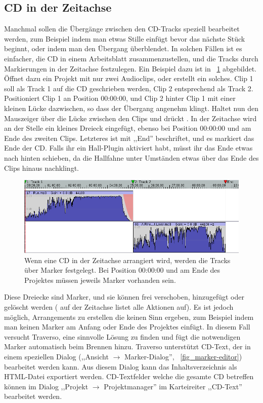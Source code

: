 \subsection{CD in der Zeitachse}
Manchmal sollen die Übergänge zwischen den CD-Tracks speziell bearbeitet werden, zum Beispiel indem man etwas Stille einfügt bevor das nächste Stück beginnt, oder indem man den Übergang überblendet. In solchen Fällen ist es einfacher, die CD in einem Arbeitsblatt zusammenzustellen, und die Tracks durch Markierungen in der Zeitachse festzulegen. Ein Beispiel dazu ist in \FigT~\ref{fig_markers01} abgebildet. Öffnet dazu ein Projekt mit nur zwei Audioclips, oder erstellt ein solches. Clip 1 soll als Track 1 auf die CD geschrieben werden, Clip 2 entsprechend als Track 2. Positioniert Clip 1 an Position 00:00:00, und Clip 2 hinter Clip 1 mit einer kleinen Lücke dazwischen, so dass der Übergang angenehm klingt. Haltet nun den Mauszeiger über die Lücke zwischen den Clips und drückt . In der Zeitachse wird an der Stelle ein kleines Dreieck eingefügt, ebenso bei Position 00:00:00 und am Ende des zweiten Clips. Letzteres ist mit ,,End'' beschriftet, und es markiert das Ende der CD. Falls ihr ein Hall-Plugin aktiviert habt, müsst ihr das Ende etwas nach hinten schieben, da die Hallfahne unter Umständen etwas über das Ende des Clips hinaus nachklingt.

\begin{figure}[t]
 \centering\includegraphics[width=\textwidth]{../images/markers01}
 \caption{Wenn eine CD in der Zeitachse arrangiert wird, werden die Tracks über Marker festgelegt. Bei Position 00:00:00 und am Ende des Projektes müssen jeweils Marker vorhanden sein.}
 \label{fig_markers01}
\end{figure}

Diese Dreiecke sind Marker, und sie können frei verschoben, hinzugefügt oder gelöscht werden ( auf der Zeitachse listet alle Aktionen auf). Es ist jedoch möglich, Arrangements zu erstellen die keinen Sinn ergeben, zum Beispiel indem man keinen Marker am Anfang oder Ende des Projektes einfügt. In diesem Fall versucht Traverso, eine sinnvolle Lösung zu finden und fügt die notwendigen Marker automatisch beim Brennen hinzu. Traverso unterstützt CD-Text, der in einem speziellen Dialog (,,Ansicht $\rightarrow$ Marker-Dialog'', \FigT~\ref{fig_marker-editor}) bearbeitet werden kann. Aus diesem Dialog kann das Inhaltsverzeichnis als HTML-Datei exportiert werden. CD-Textfelder welche die gesamte CD betreffen können im Dialog ,,Projekt $\rightarrow$ Projektmanager'' im Karteireiter ,,CD-Text'' bearbeitet werden.

